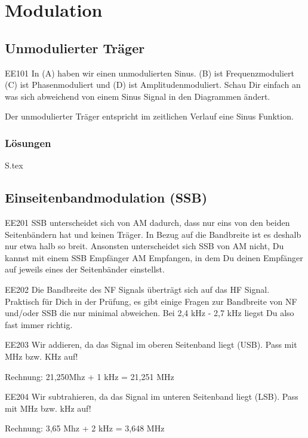 \documentclass[10pt,a4paper,ngerman]{article}
\theoremstyle{definition}
\theoremstyle{plain}
\theoremstyle{mytheorem}
\theoremstyle{definition}
\newenvironment{ohmchapter}{}
{
  \subsubsection*{Lösungen}
  S\arabic{subsection}.tex}
}
\begin{document}
\section{Modulation}
\subsection{Unmodulierter Träger}


\begin{sol}{EE101}
  In (A) haben wir einen unmodulierten Sinus. (B) ist Frequenzmoduliert (C) ist Phasenmoduliert und (D) ist Amplitudenmoduliert. Schau Dir einfach an was sich abweichend von einem Sinus Signal in den Diagrammen ändert.
\end{sol}

\begin{ohmchapter}
  Der unmodulierter Träger entspricht im zeitlichen Verlauf eine Sinus Funktion.

\end{ohmchapter}  

\subsection{Einseitenbandmodulation (SSB)}

\begin{sol}{EE201}
  SSB unterscheidet sich von AM dadurch, dass nur eins von den beiden Seitenbändern hat und keinen Träger. In Bezug auf die Bandbreite ist es deshalb nur etwa halb so breit. Ansonsten unterscheidet sich SSB von AM nicht, Du kannst mit einem SSB Empfänger AM Empfangen, in dem Du deinen Empfänger auf jeweils eines der Seitenbänder einstellst.
\end{sol}

\begin{sol}{EE202}
  Die Bandbreite des NF Signals überträgt sich auf das HF Signal. Praktisch für Dich in der Prüfung, es gibt einige Fragen zur Bandbreite von NF und/oder SSB die nur minimal abweichen. Bei 2,4 kHz - 2,7 kHz liegst Du also fast immer richtig.

\end{sol}

\begin{sol}{EE203}
  Wir addieren, da das Signal im oberen Seitenband liegt (USB). Pass mit MHz bzw. KHz auf!
  
  Rechnung: 21,250Mhz + 1 kHz = 21,251 MHz 
\end{sol}

\begin{sol}{EE204}
  Wir subtrahieren, da das Signal im unteren Seitenband liegt (LSB). Pass mit MHz bzw. kHz auf!
  
  Rechnung: 3,65 Mhz + 2 kHz = 3,648 MHz 
\end{sol}
\end{document}
